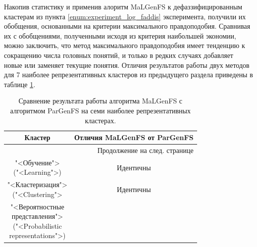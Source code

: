 \documentclass[12pt]{article}
\begin{document}
Накопив статистику и применив алоритм MaLGenFS к дефаззифицированным кластерам из пункта \ref{enum:experiment_log_faddis} эксперимента, получили их обобщения, основанными на критерии максимального правдоподобия. Сравнивая их с обобщениями, полученными исходя из критерия наибольшей экономии, можно заключить, что метод максимального правдоподобия имеет тенденцию к сокращению числа головных понятий, и только в редких случаях добавляет новые или заменяет текущие понятия. Отличия результатов работы двух методов для 7 наиболее репрезентативных кластеров из предыдущего раздела приведены в таблице \ref{table:mals_vs_pars}. 

\begin{center}
	\centering
	{ \begin{longtable}{|c|c|}
		\caption{Сравнение результата работы алгоритма MaLGenFS с алгоритмом ParGenFS на семи наиболее репрезентативных кластерах.} \label{table:mals_vs_pars}\\
		\hline
		Кластер & Отличия MaLGenFS от ParGenFS \\
		\hline
		\endhead
		\hline
		\multicolumn{2}{r}{{Продолжение на след. странице}} \\
		\endfoot
		\hline
		\endlastfoot

			\makecell{"<Обучение">\\("<Learning">)}& Идентичны  \\ 
			\hline 
			\makecell{"<Кластеризация">\\("<Clustering">} & Идентичны \\ 
			\hline 
			\makecell{"<Вероятностные\\представления">\\("<Probabilistic\\representations">)}  & 
			

\end{longtable}}
\end{center}
\end{document}
